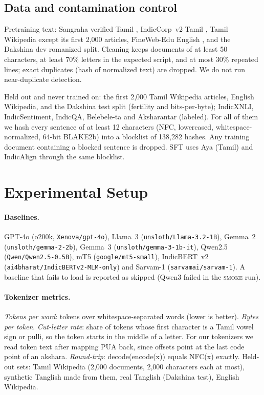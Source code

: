\documentclass[11pt]{article}
\newcommand{\smoke}{\textsc{smoke}}
\begin{document}
\subsection{Data and contamination control}
\label{sec:data}
Pretraining text: Sangraha verified Tamil \cite{khan2024indicllmsuite}, IndicCorp~v2 Tamil \cite{kakwani2020indicnlpsuite}, Tamil Wikipedia except its first 2,000 articles, FineWeb-Edu English \cite{penedo2024fineweb}, and the Dakshina dev romanized split.
Cleaning keeps documents of at least 50 characters, at least 70\% letters in the expected script, and at most 30\% repeated lines; exact duplicates (hash of normalized text) are dropped.
We do not run near-duplicate detection.

Held out and never trained on: the first 2,000 Tamil Wikipedia articles, English Wikipedia, and the Dakshina test split (fertility and bits-per-byte); IndicXNLI, IndicSentiment, IndicQA, Belebele-ta and Aksharantar (labeled).
For all of them we hash every sentence of at least 12 characters (NFC, lowercased, whitespace-normalized, 64-bit BLAKE2b) into a blocklist of 138,282 hashes.
Any training document containing a blocked sentence is dropped.
SFT uses Aya (Tamil) \cite{singh2024aya} and IndicAlign \cite{khan2024indicllmsuite} through the same blocklist.

\section{Experimental Setup}

\paragraph{Baselines.}
GPT-4o (o200k, \texttt{Xenova/gpt-4o}), Llama~3 (\texttt{unsloth/Llama-3.2-1B}), Gemma~2 (\texttt{unsloth/gemma-2-2b}), Gemma~3 (\texttt{unsloth/gemma-3-1b-it}), Qwen2.5 (\texttt{Qwen/Qwen2.5-0.5B}), mT5 (\texttt{google/mt5-small}), IndicBERT~v2 (\texttt{ai4bharat/IndicBERTv2-MLM-only}) and Sarvam-1 (\texttt{sarvamai/sarvam-1}).
A baseline that fails to load is reported as skipped (Qwen3 failed in the \smoke{} run).

\paragraph{Tokenizer metrics.}
\emph{Tokens per word}: tokens over whitespace-separated words (lower is better).
\emph{Bytes per token}.
\emph{Cut-letter rate}: share of tokens whose first character is a Tamil vowel sign or pulli, so the token starts in the middle of a letter. For our tokenizers we read token text after mapping PUA back, since offsets point at the last code point of an akshara.
\emph{Round-trip}: decode(encode(x)) equals NFC(x) exactly.
Held-out sets: Tamil Wikipedia (2,000 documents, 2,000 characters each at most), synthetic Tanglish made from them, real Tanglish (Dakshina test), English Wikipedia.
\end{document}
